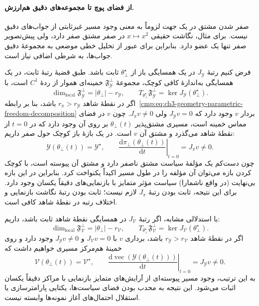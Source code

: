 \paragraph{از فضای پوچ تا مجموعه‌های دقیق هم‌ارزش.}
صفر شدن مشتق در یک جهت لزوماً به معنی وجود مسیر غیرثابتی از جواب‌های دقیق نیست. برای مثال، نگاشت حقیقی $x\mapsto x^2$ در صفر مشتق صفر دارد، ولی پیش‌تصویر صفر تنها یک عضو دارد. بنابراین برای عبور از تحلیل خطی موضعی به مجموعهٔ دقیق جواب‌ها، به شرطی اضافی نیاز است.

فرض کنیم رتبهٔ $J_{\mathscr Y}$ در یک همسایگی باز از $\theta_\bot^\star$ ثابت باشد. طبق قضیهٔ رتبهٔ ثابت، در یک همسایگی به‌اندازهٔ کافی کوچک، مجموعهٔ $\mathfrak F_{\mathscr Y}^\bot$ خمینه‌ای هموار از ردهٔ $C^1$ است، با
\begin{equation}\label{cmp:eq:ch3-geometry-parametric-Y-fiber-dimension}
\dim_{\mathrm{local}}\mathfrak F_{\mathscr Y}^\bot=|\theta_\bot|-r_{\mathscr Y},
\qquad
T_{\theta_\bot^\star}\mathfrak F_{\mathscr Y}^\bot=\ker J_{\mathscr Y}(\theta_\bot^\star).
\end{equation}
اگر در نقطهٔ شاهد $r_\pi>r_{\mathscr Y}$ باشد، بنا بر رابطه~\eqref{cmp:eq:ch3-geometry-parametric-freedom-decomposition} بردار $v$ وجود دارد که $J_{\mathscr Y}v=0$ ولی $J_\pi v\ne0$. چون $v$ در فضای مماس خمینه است، مسیری مشتق‌پذیر $\theta_\bot(t)$ بر روی آن وجود دارد که در $t=0$ از نقطهٔ شاهد می‌گذرد و مشتق آن $v$ است. در یک بازهٔ باز کوچک حول صفر داریم:
\begin{equation}\label{cmp:eq:ch3-geometry-parametric-exact-Y-path}
\mathscr Y(\theta_\bot(t))=\mathscr Y^\star,
\qquad
\left.\frac{\mathrm d\pi_\bot(\theta_\bot(t))}{\mathrm dt}\right|_{t=0}=J_\pi v\ne0.
\end{equation}
چون دست‌کم یک مؤلفهٔ سیاست مشتق ناصفر دارد و مشتق آن پیوسته است، با کوچک کردن بازه می‌توان آن مؤلفه را در طول مسیر اکیداً یکنواخت کرد. بنابراین در این بازه بی‌نهایت (در واقع ناشمارا) سیاست مؤثر متمایز با بازنمایی‌های دقیقاً یکسان وجود دارد. برای این نتیجه، ثابت بودن رتبهٔ $J_\pi$ لازم نیست؛ ثابت بودن رتبهٔ نگاشت بازنمایی و اختلاف رتبه در نقطهٔ شاهد کافی است.

با استدلالی مشابه، اگر رتبهٔ $J_{\mathcal V}$ در همسایگی نقطهٔ شاهد ثابت باشد، داریم:
\begin{equation}\label{cmp:eq:ch3-geometry-parametric-V-fiber-dimension}
\dim_{\mathrm{local}}\mathfrak F_{\mathcal V}^\bot=|\theta_\bot|-r_{\mathcal V},
\qquad
T_{\theta_\bot^\star}\mathfrak F_{\mathcal V}^\bot=\ker J_{\mathcal V}(\theta_\bot^\star).
\end{equation}
اگر در نقطهٔ شاهد $r_{\mathscr Y}>r_{\mathcal V}$ باشد، برداری $v$ با $J_{\mathcal V}v=0$ و $J_{\mathscr Y}v\ne0$ وجود دارد و روی خمینهٔ هم‌مرکز مسیری خواهیم داشت که
\begin{equation}\label{cmp:eq:ch3-geometry-parametric-exact-V-path}
\mathcal V(\theta_\bot(t))=\mathcal V^\star,
\qquad
\left.\frac{\mathrm d\operatorname{vec}(\mathscr Y(\theta_\bot(t)))}{\mathrm dt}\right|_{t=0}=J_{\mathscr Y}v\ne0.
\end{equation}
به این ترتیب، وجود مسیر پیوسته‌ای از آرایش‌های متمایز بازنمایی با مراکز دقیقاً یکسان اثبات می‌شود. این نتیجه به محدب بودن فضای سیاست‌ها، یکتایی پارامترسازی یا استقلال احتمال‌های آغاز نمونه‌ها وابسته نیست.

